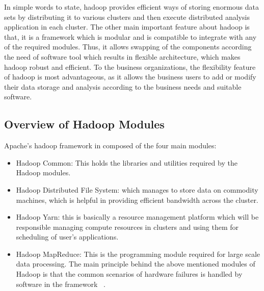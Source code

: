 In simple words to state, hadoop provides efficient ways of storing enormous 
data sets by distributing it to various clusters and then execute distributed 
analysis application in each cluster. The other main important feature about 
hadoop is that, it is a framework which is modular and is compatible to 
integrate with any of the required modules. Thus, it allows swapping of the 
components according the need of software tool which results in flexible 
architecture, which makes hadoop robust and efficient. To the business 
organizations, the flexibility feature of hadoop is most advantageous, as it 
allows the business users to add or modify their data storage and analysis  
according to the business needs and suitable software.


\subsection{Overview of Hadoop Modules}
Apache's hadoop framework in composed of the four main modules:

\begin{itemize}
\item Hadoop Common: This holds the libraries and utilities required by the Hadoop 
modules.
\item Hadoop Distributed File System: which manages to store data on commodity 
machines, which is helpful in providing efficient bandwidth across the cluster.
\item Hadoop Yarn: this is basically a resource management platform which will be 
responsible managing compute resources in clusters and using them for scheduling
of user's applications.
\item Hadoop MapReduce: This is the programming module required for large scale 
data processing.
The main principle behind the above mentioned modules of Hadoop is that the 
common scenarios of  hardware failures is handled by software in the framework
~\cite{hid-sp18-406-hadoop-intro5}.
\end{itemize}

